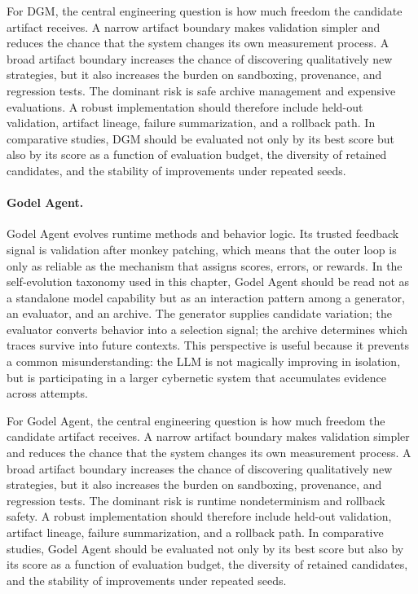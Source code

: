 For DGM, the central engineering question is how much freedom the candidate artifact receives.  A narrow artifact boundary makes validation simpler and reduces the chance that the system changes its own measurement process.  A broad artifact boundary increases the chance of discovering qualitatively new strategies, but it also increases the burden on sandboxing, provenance, and regression tests.  The dominant risk is safe archive management and expensive evaluations.  A robust implementation should therefore include held-out validation, artifact lineage, failure summarization, and a rollback path.  In comparative studies, DGM should be evaluated not only by its best score but also by its score as a function of evaluation budget, the diversity of retained candidates, and the stability of improvements under repeated seeds.

\paragraph{Godel Agent.} Godel Agent evolves runtime methods and behavior logic.  Its trusted feedback signal is validation after monkey patching, which means that the outer loop is only as reliable as the mechanism that assigns scores, errors, or rewards.  In the self-evolution taxonomy used in this chapter, Godel Agent should be read not as a standalone model capability but as an interaction pattern among a generator, an evaluator, and an archive.  The generator supplies candidate variation; the evaluator converts behavior into a selection signal; the archive determines which traces survive into future contexts.  This perspective is useful because it prevents a common misunderstanding: the LLM is not magically improving in isolation, but is participating in a larger cybernetic system that accumulates evidence across attempts.

For Godel Agent, the central engineering question is how much freedom the candidate artifact receives.  A narrow artifact boundary makes validation simpler and reduces the chance that the system changes its own measurement process.  A broad artifact boundary increases the chance of discovering qualitatively new strategies, but it also increases the burden on sandboxing, provenance, and regression tests.  The dominant risk is runtime nondeterminism and rollback safety.  A robust implementation should therefore include held-out validation, artifact lineage, failure summarization, and a rollback path.  In comparative studies, Godel Agent should be evaluated not only by its best score but also by its score as a function of evaluation budget, the diversity of retained candidates, and the stability of improvements under repeated seeds.

